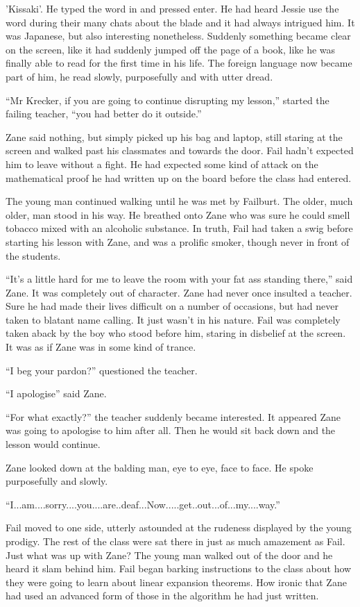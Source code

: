 'Kissaki'.  He typed the word in and pressed enter.  He had heard Jessie use the word during their many chats about the blade and it had always intrigued him.  It was Japanese, but also interesting nonetheless.  Suddenly something became clear on the screen, like it had suddenly jumped off the page of a book, like he was finally able to read for the first time in his life.  The foreign language now became part of him, he read slowly, purposefully and with utter dread.

``Mr Krecker, if you are going to continue disrupting my lesson,'' started the failing teacher, ``you had better do it outside.''

Zane said nothing, but simply picked up his bag and laptop, still staring at the screen and walked past his classmates and towards the door.  Fail hadn't expected him to leave without a fight.  He had expected some kind of attack on the mathematical proof he had written up on the board before the class had entered.

The young man continued walking until he was met by Failburt.  The older, much older, man stood in his way.  He breathed onto Zane who was sure he could smell tobacco mixed with an alcoholic substance.  In truth, Fail had taken a swig before starting his lesson with Zane, and was a prolific smoker, though never in front of the students.

``It's a little hard for me to leave the room with your fat ass standing there,'' said Zane.  It was completely out of character.  Zane had never once insulted a teacher.  Sure he had made their lives difficult on a number of occasions, but had never taken to blatant name calling.  It just wasn't in his nature.  Fail was completely taken aback by the boy who stood before him, staring in disbelief at the screen.  It was as if Zane was in some kind of trance.  

``I beg your pardon?'' questioned the teacher.

``I apologise'' said Zane.

``For what exactly?'' the teacher suddenly became interested.  It appeared Zane was going to apologise to him after all.  Then he would sit back down and the lesson would continue.

Zane looked down at the balding man, eye to eye, face to face.  He spoke purposefully and slowly.

``I...am....sorry....you....are..deaf...Now.....get..out...of...my....way.''

Fail moved to one side, utterly astounded at the rudeness displayed by the young prodigy.  The rest of the class were sat there in just as much amazement as Fail.  Just what was up with Zane?  The young man walked out of the door and he heard it slam behind him.  Fail began barking instructions to the class about how they were going to learn about linear expansion theorems.  How ironic that Zane had used an advanced form of those in the algorithm he had just written.

